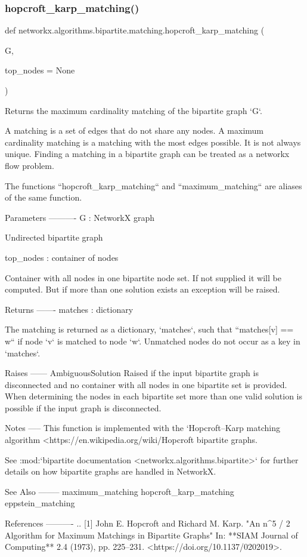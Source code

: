 \subsubsection{\texorpdfstring{hopcroft\+\_\+karp\+\_\+matching()}{hopcroft\_karp\_matching()}}
{\footnotesize\ttfamily def networkx.\+algorithms.\+bipartite.\+matching.\+hopcroft\+\_\+karp\+\_\+matching (\begin{DoxyParamCaption}\item[{}]{G,  }\item[{}]{top\+\_\+nodes = {\ttfamily None} }\end{DoxyParamCaption})}

\begin{DoxyVerb}Returns the maximum cardinality matching of the bipartite graph `G`.

A matching is a set of edges that do not share any nodes. A maximum
cardinality matching is a matching with the most edges possible. It
is not always unique. Finding a matching in a bipartite graph can be
treated as a networkx flow problem.

The functions ``hopcroft_karp_matching`` and ``maximum_matching``
are aliases of the same function.

Parameters
----------
G : NetworkX graph

  Undirected bipartite graph

top_nodes : container of nodes

  Container with all nodes in one bipartite node set. If not supplied
  it will be computed. But if more than one solution exists an exception
  will be raised.

Returns
-------
matches : dictionary

  The matching is returned as a dictionary, `matches`, such that
  ``matches[v] == w`` if node `v` is matched to node `w`. Unmatched
  nodes do not occur as a key in `matches`.

Raises
------
AmbiguousSolution
  Raised if the input bipartite graph is disconnected and no container
  with all nodes in one bipartite set is provided. When determining
  the nodes in each bipartite set more than one valid solution is
  possible if the input graph is disconnected.

Notes
-----
This function is implemented with the `Hopcroft--Karp matching algorithm
<https://en.wikipedia.org/wiki/Hopcroft%
bipartite graphs.

See :mod:`bipartite documentation <networkx.algorithms.bipartite>`
for further details on how bipartite graphs are handled in NetworkX.

See Also
--------
maximum_matching
hopcroft_karp_matching
eppstein_matching

References
----------
.. [1] John E. Hopcroft and Richard M. Karp. "An n^{5 / 2} Algorithm for
   Maximum Matchings in Bipartite Graphs" In: **SIAM Journal of Computing**
   2.4 (1973), pp. 225--231. <https://doi.org/10.1137/0202019>.\end{DoxyVerb}

